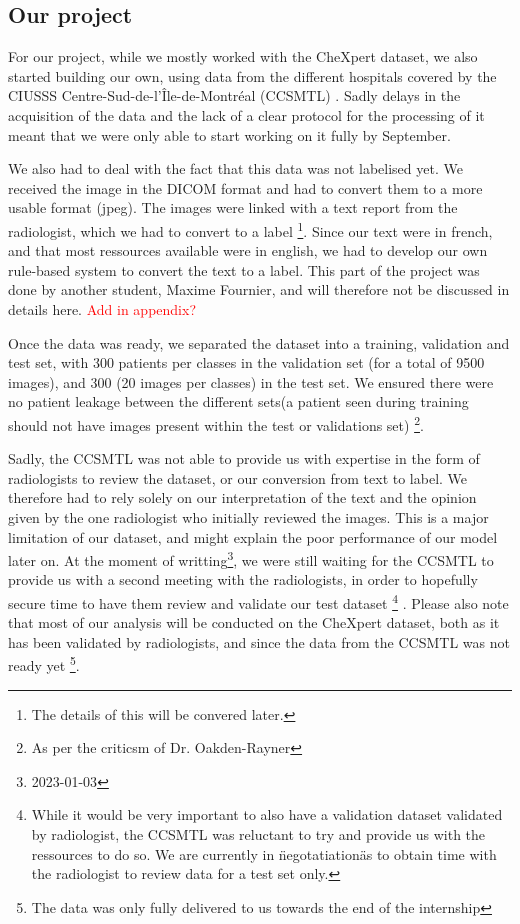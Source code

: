 \documentclass[11pt]{article}
\newcommand\myworries[1]{\textcolor{red}{#1}}
\begin{document}
    \subsection{Our project}

        For our project, while we mostly worked with the CheXpert dataset, we also started building our own, using
        data from the different hospitals covered by the CIUSSS Centre-Sud-de-l'Île-de-Montréal (CCSMTL)
        . Sadly delays in the acquisition of the data and the lack of a clear protocol for the
    processing of it meant that we were only able to start working on it fully by September.

    We also had to deal with the fact that this data was not labelised yet. We received the image in the DICOM
    format and had to convert them to a more usable format (jpeg). The images were linked with a text
    report from the radiologist, which we had to convert to a label \footnote{The details of this will be convered later.}. Since our text were in french, and that most
    ressources available were in english, we had to develop our own rule-based system to convert the text to a label.
    This part of the project was done by another student, Maxime Fournier, and will therefore not be discussed in
    details here. \myworries{Add in appendix?}

    Once the data was ready, we separated the dataset into a training, validation and test set, with 300 patients per
    classes in the validation set (for a total of 9500 images), and 300 (20 images per classes) in the test set.
    We ensured there were no patient leakage between the different sets(a patient seen during training should not
    have images present within the test or validations set) \footnote{As per the criticsm of Dr.
    Oakden-Rayner}.

    Sadly, the CCSMTL was not able to provide us with expertise in the form of radiologists to review the dataset, or
    our conversion from text to label. We therefore had to rely solely on our interpretation of the text and the
    opinion given by the one radiologist who initially reviewed the images. This is a major limitation of our dataset,
    and might explain the poor performance of our model later on. At the moment of writting\footnote{2023-01-03}, we
    were still waiting  for the CCSMTL to provide us with a second meeting with the radiologists, in order to
    hopefully secure time to have them review and validate our test dataset \footnote{While it would be very
    important to also have a validation dataset validated by radiologist, the CCSMTL was reluctant to try and provide
    us with the ressources to do so. We are currently in \" negotatiation\" as to obtain time with the radiologist to review data for a test set only.} . Please also note that most
    of our analysis will be conducted on the CheXpert dataset, both as it has been validated by radiologists, and
    since the data from the CCSMTL was not ready yet \footnote{The data was only fully delivered to us towards
    the end of the internship}.
\end{document}
